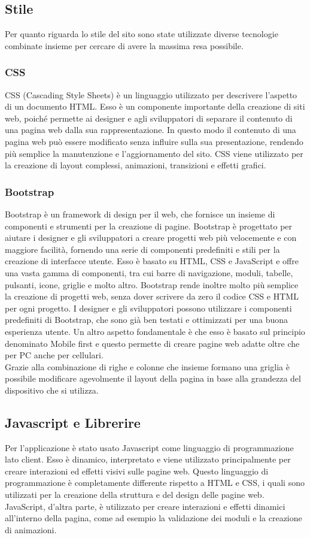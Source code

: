 \documentclass[a4paper,final,12pt]{report}
\begin{document}
\subsection{Stile}
Per quanto riguarda lo stile del sito sono state utilizzate diverse tecnologie combinate insieme per cercare di avere la massima resa possibile.

\subsubsection{CSS}
CSS (Cascading Style Sheets) è un linguaggio utilizzato per descrivere l'aspetto di un documento HTML. Esso è un componente importante della creazione di siti web, poiché permette ai designer e agli sviluppatori di separare il contenuto di una pagina web dalla sua rappresentazione. In questo modo il contenuto di una pagina web può essere modificato senza influire sulla sua presentazione, rendendo più semplice la manutenzione e l'aggiornamento del sito. CSS viene utilizzato per la creazione di layout complessi, animazioni, transizioni e effetti grafici. 

\subsubsection{Bootstrap}
Bootstrap è un framework di design per il web, che fornisce un insieme di componenti e strumenti per la creazione di pagine. Bootstrap è progettato per aiutare i designer e gli sviluppatori a creare progetti web più velocemente e con maggiore facilità, fornendo una serie di componenti predefiniti e stili per la creazione di interfacce utente. Esso è basato su HTML, CSS e JavaScript e offre una vasta gamma di componenti, tra cui barre di navigazione, moduli, tabelle, pulsanti, icone, griglie e molto altro.
Bootstrap rende inoltre molto più semplice la creazione di progetti web, senza dover scrivere da zero il codice CSS e HTML per ogni progetto. I designer e gli sviluppatori possono utilizzare i componenti predefiniti di Bootstrap, che sono già ben testati e ottimizzati per una buona esperienza utente.
Un altro aspetto fondamentale è che esso è basato sul principio denominato Mobile first e questo permette di creare pagine web adatte oltre che per PC anche per cellulari.\\ Grazie alla combinazione di righe e colonne che insieme formano una griglia è possibile modificare agevolmente il layout della pagina in base alla grandezza del dispositivo che si utilizza.

\subsection{Javascript e Librerire}
Per l'applicazione è stato usato Javascript come linguaggio di programmazione lato client. Esso è dinamico, interpretato e viene utilizzato principalmente per creare interazioni ed effetti visivi sulle pagine web. Questo linguaggio di programmazione è completamente differente rispetto a HTML e CSS, i quali sono utilizzati per la creazione della struttura e del design delle pagine web. JavaScript, d'altra parte, è utilizzato per creare interazioni e effetti dinamici all'interno della pagina, come ad esempio la validazione dei moduli e la creazione di animazioni.
\end{document}
